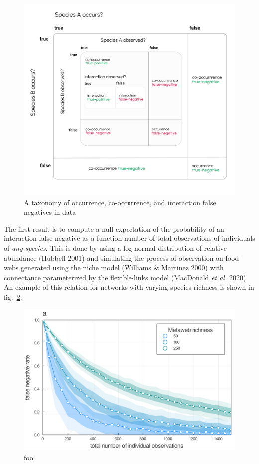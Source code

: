 \documentclass[10pt,oneside]{article}
\makeatletter
\def\maxwidth{\ifdim\Gin@nat@width>\linewidth\linewidth
\else\Gin@nat@width\fi}
\let\Oldincludegraphics\includegraphics
\renewcommand{\includegraphics}[1]{\Oldincludegraphics[width=\maxwidth]{#1}}
\makeatother
\begin{document}
\begin{figure}
\hypertarget{fig:fnrtaxonomy}{%
\centering
\includegraphics{./figures/ch2.png}
\caption{A taxonomy of occurrence, co-occurrence, and interaction false
negatives in data}\label{fig:fnrtaxonomy}
}
\end{figure}

The first result is to compute a null expectation of the probability of
an interaction false-negative as a function number of total observations
of individuals of \emph{any species}. This is done by using a log-normal
distribution of relative abundance (Hubbell 2001) and simulating the
process of observation on food-webs generated using the niche model
(Williams \& Martinez 2000) with connectance parameterized by the
flexible-links model (MacDonald \emph{et al.} 2020). An example of this
relation for networks with varying spceies richness is shown in
fig.~\ref{fig:fnr}.

\begin{figure}
\hypertarget{fig:fnr}{%
\centering
\includegraphics{./figures/ch2_fnr.png}
\caption{foo}\label{fig:fnr}
}
\end{figure}
\end{document}
